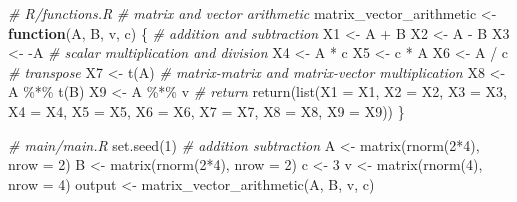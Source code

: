 \documentclass[
]{book}
\newenvironment{Shaded}{\begin{snugshade}}{\end{snugshade}}
\newcommand{\AttributeTok}[1]{\textcolor[rgb]{0.77,0.63,0.00}{#1}}
\newcommand{\CommentTok}[1]{\textcolor[rgb]{0.56,0.35,0.01}{\textit{#1}}}
\newcommand{\ControlFlowTok}[1]{\textcolor[rgb]{0.13,0.29,0.53}{\textbf{#1}}}
\newcommand{\DecValTok}[1]{\textcolor[rgb]{0.00,0.00,0.81}{#1}}
\newcommand{\FunctionTok}[1]{\textcolor[rgb]{0.00,0.00,0.00}{#1}}
\newcommand{\NormalTok}[1]{#1}
\newcommand{\OtherTok}[1]{\textcolor[rgb]{0.56,0.35,0.01}{#1}}
\newcommand{\SpecialCharTok}[1]{\textcolor[rgb]{0.00,0.00,0.00}{#1}}
\begin{document}
\begin{Shaded}
\begin{Highlighting}[]
\CommentTok{\# R/functions.R}
\CommentTok{\# matrix and vector arithmetic}
\NormalTok{matrix\_vector\_arithmetic }\OtherTok{\textless{}{-}}
  \ControlFlowTok{function}\NormalTok{(A, B, v, c) \{}
    \CommentTok{\# addition and subtraction}
\NormalTok{    X1 }\OtherTok{\textless{}{-}}\NormalTok{ A }\SpecialCharTok{+}\NormalTok{ B}
\NormalTok{    X2 }\OtherTok{\textless{}{-}}\NormalTok{ A }\SpecialCharTok{{-}}\NormalTok{ B}
\NormalTok{    X3 }\OtherTok{\textless{}{-}} \SpecialCharTok{{-}}\NormalTok{A}
    \CommentTok{\# scalar multiplication and division}
\NormalTok{    X4 }\OtherTok{\textless{}{-}}\NormalTok{ A }\SpecialCharTok{*}\NormalTok{ c}
\NormalTok{    X5 }\OtherTok{\textless{}{-}}\NormalTok{ c }\SpecialCharTok{*}\NormalTok{ A}
\NormalTok{    X6 }\OtherTok{\textless{}{-}}\NormalTok{ A }\SpecialCharTok{/}\NormalTok{ c}
    \CommentTok{\# transpose}
\NormalTok{    X7 }\OtherTok{\textless{}{-}} \FunctionTok{t}\NormalTok{(A)}
    \CommentTok{\# matrix{-}matrix and matrix{-}vector multiplication}
\NormalTok{    X8 }\OtherTok{\textless{}{-}}\NormalTok{ A }\SpecialCharTok{\%*\%} \FunctionTok{t}\NormalTok{(B)}
\NormalTok{    X9 }\OtherTok{\textless{}{-}}\NormalTok{ A }\SpecialCharTok{\%*\%}\NormalTok{ v}
    \CommentTok{\# return}
    \FunctionTok{return}\NormalTok{(}\FunctionTok{list}\NormalTok{(}\AttributeTok{X1 =}\NormalTok{ X1,}
                \AttributeTok{X2 =}\NormalTok{ X2,}
                \AttributeTok{X3 =}\NormalTok{ X3,}
                \AttributeTok{X4 =}\NormalTok{ X4,}
                \AttributeTok{X5 =}\NormalTok{ X5,}
                \AttributeTok{X6 =}\NormalTok{ X6,}
                \AttributeTok{X7 =}\NormalTok{ X7,}
                \AttributeTok{X8 =}\NormalTok{ X8,}
                \AttributeTok{X9 =}\NormalTok{ X9))}
\NormalTok{  \}}
\end{Highlighting}
\end{Shaded}

\begin{Shaded}
\begin{Highlighting}[]
\CommentTok{\# main/main.R}
\FunctionTok{set.seed}\NormalTok{(}\DecValTok{1}\NormalTok{)}
\CommentTok{\# addition subtraction}
\NormalTok{A }\OtherTok{\textless{}{-}} \FunctionTok{matrix}\NormalTok{(}\FunctionTok{rnorm}\NormalTok{(}\DecValTok{2}\SpecialCharTok{*}\DecValTok{4}\NormalTok{), }\AttributeTok{nrow =} \DecValTok{2}\NormalTok{)}
\NormalTok{B }\OtherTok{\textless{}{-}} \FunctionTok{matrix}\NormalTok{(}\FunctionTok{rnorm}\NormalTok{(}\DecValTok{2}\SpecialCharTok{*}\DecValTok{4}\NormalTok{), }\AttributeTok{nrow =} \DecValTok{2}\NormalTok{)}
\NormalTok{c }\OtherTok{\textless{}{-}} \DecValTok{3}
\NormalTok{v }\OtherTok{\textless{}{-}} \FunctionTok{matrix}\NormalTok{(}\FunctionTok{rnorm}\NormalTok{(}\DecValTok{4}\NormalTok{), }\AttributeTok{nrow =} \DecValTok{4}\NormalTok{)}
\NormalTok{output }\OtherTok{\textless{}{-}} \FunctionTok{matrix\_vector\_arithmetic}\NormalTok{(A, B, v, c)}
\end{Highlighting}
\end{Shaded}
\end{document}
